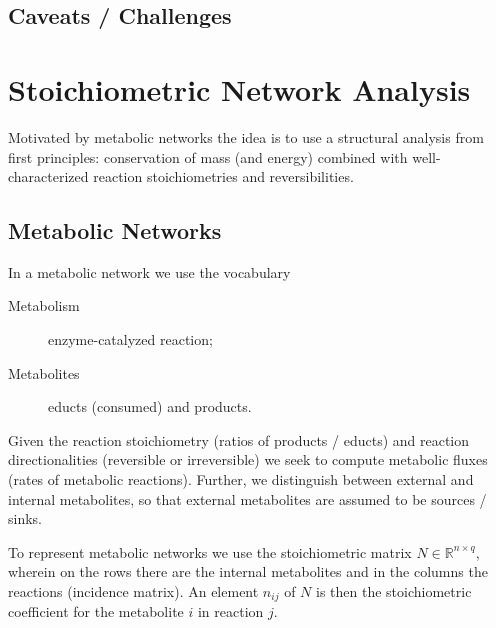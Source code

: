\documentclass[a4paper]{article}
\theoremstyle{plain}
\theoremstyle{definition}
\theoremstyle{remark}
\begin{document}
\subsection{Caveats / Challenges}


\section{Stoichiometric Network Analysis}

Motivated by metabolic networks the idea is to use a structural analysis from
first principles: conservation of mass (and energy) combined with
well-characterized reaction stoichiometries and reversibilities.


\subsection{Metabolic Networks}

In a metabolic network we use the vocabulary
\begin{description}
  \item[Metabolism] enzyme-catalyzed reaction;
  \item[Metabolites] educts (consumed) and products.
\end{description}
Given the reaction stoichiometry (ratios of products / educts) and reaction
directionalities (reversible or irreversible) we seek to compute metabolic
fluxes (rates of metabolic reactions). Further, we distinguish between
external and internal metabolites, so that external metabolites are assumed to
be sources / sinks.

To represent metabolic networks we use the stoichiometric matrix $N \in
\mathbb{R}^{n \times q}$, wherein on the rows there are the internal
metabolites and in the columns the reactions (incidence matrix). An element
$n_{ij}$ of $N$ is then the stoichiometric coefficient for the metabolite $i$
in reaction $j$. 
\end{document}
